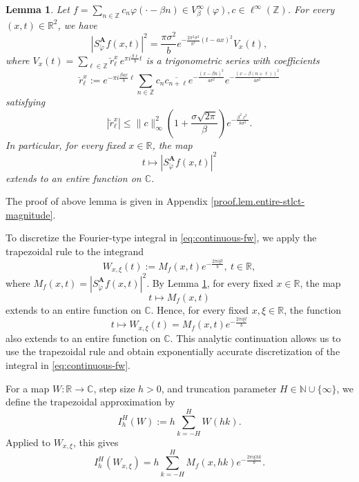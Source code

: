 \documentclass[11pt, reqno]{amsart}
\newtheorem{lemma}[theorem]{Lemma}%
\newcommand{\N}{\mathbb{N}}
\newcommand{\Z}{\mathbb{Z}}
\newcommand{\R}{\mathbb{R}}
\newcommand{\C}{\mathbb{C}}
\numberwithin{equation}{section}
\begin{document}
\begin{lemma}\label{lem:entire-stlct-magnitude}
Let $f=\sum_{n\in\Z} c_n\varphi(\cdot-\beta n)\in V_\beta^\infty(\varphi), c\in\ell^\infty(\Z)$. For every $(x,t)\in\R^2$, we have 
$$ |S_{\check{\varphi}}^{\mathbf A}f(x,t)|^2 = \frac{\pi\sigma^2}{b} e^{-\frac{2\pi^2\sigma^2}{b^2}(t-ax)^2}V_x(t),$$
where $V_x(t)=\sum_{\ell\in\Z}\breve r_\ell^x\,e^{\pi i\frac{\beta\ell}{b}t}$
is a trigonometric series with coefficients
\begin{equation}\label{trig.coef.lem.def.eq1}
\breve r_\ell^x:=e^{-\pi i\frac{\beta ax}{b}\ell}\sum_{n\in\Z}c_n\overline{c_{n+\ell}}e^{-\frac{(x-\beta n)^2}{4\sigma^2}}e^{-\frac{(x-\beta (n+\ell))^2}{4\sigma^2}}
\end{equation}
satisfying 
$$ |\breve r_\ell^x| \le \|c\|_\infty^2\left(1+\frac{\sigma\sqrt{2\pi}}{\beta}\right)
e^{-\frac{\beta^2\ell^2}{8\sigma^2}}.$$  
In particular, for every fixed $x\in\R$, the map 
$$t\mapsto |S_{\check{\varphi}}^{\mathbf A}f(x,t)|^2$$ extends to an entire function on $\C$. %
\end{lemma}

    The proof of above lemma is given in Appendix \ref{proof.lem.entire-stlct-magnitude}.



\smallskip 

To discretize the Fourier-type integral in \eqref{eq:continuous-fw}, we apply the trapezoidal rule to the integrand
$$W_{x,\xi}(t):=M_f(x,t)e^{-\frac{2\pi i\xi t}{b}}, \  t\in\R,$$
where $M_f(x,t)=|S_{\check{\varphi}}^{\mathbf A}f(x,t)|^2.$ 
By Lemma \ref{lem:entire-stlct-magnitude}, for every fixed $x\in\R$, the map
$$t\mapsto M_f(x,t)$$
extends to an entire function on $\C$. Hence, for every fixed $x, \xi\in\R$, the function
$$ t\mapsto W_{x,\xi}(t)=M_f(x,t)e^{-\frac{2\pi i\xi t}{b}}$$
also extends to an entire function on $\C$. This analytic continuation allows us to use the trapezoidal rule and obtain exponentially accurate discretization of the integral in \eqref{eq:continuous-fw}.

For a map $W:\R\to\C$, step size $h>0$, and truncation parameter $H\in\N\cup\{\infty\}$, we define the trapezoidal approximation by
$$ I_h^H(W):=h\sum_{k=-H}^{H}W(hk).$$
Applied to $W_{x,\xi}$, this gives
\begin{equation*}
I_h^H(W_{x,\xi})=h\sum_{k=-H}^{H}M_f(x,hk)e^{-\frac{2\pi i\xi hk}{b}}.
\end{equation*}
\end{document}
